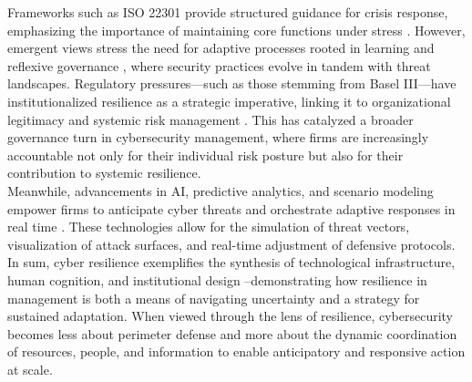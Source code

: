 Frameworks such as ISO 22301 provide structured guidance for crisis response, emphasizing the importance of maintaining core functions under stress \autocite{iso201922301}. However, emergent views stress the need for adaptive processes rooted in learning and reflexive governance \autocite{hausken2020cyber}, where security practices evolve in tandem with threat landscapes. Regulatory pressures—such as those stemming from Basel III—have institutionalized resilience as a strategic imperative, linking it to organizational legitimacy and systemic risk management \autocite{baselcommittee2011basel, almeida2020challenges}. This has catalyzed a broader governance turn in cybersecurity management, where firms are increasingly accountable not only for their individual risk posture but also for their contribution to systemic resilience.\\

Meanwhile, advancements in AI, predictive analytics, and scenario modeling empower firms to anticipate cyber threats and orchestrate adaptive responses in real time \autocite{kuypers2018designing, gillard2023efficient}. These technologies allow for the simulation of threat vectors, visualization of attack surfaces, and real-time adjustment of defensive protocols. In sum, cyber resilience exemplifies the synthesis of technological infrastructure, human cognition, and institutional design --demonstrating how resilience in management is both a means of navigating uncertainty and a strategy for sustained adaptation. When viewed through the lens of resilience, cybersecurity becomes less about perimeter defense and more about the dynamic coordination of resources, people, and information to enable anticipatory and responsive action at scale.